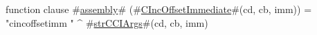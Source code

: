 function clause #\hyperref[sailMIPSzassembly]{assembly}# (#\hyperref[sailMIPSzCIncOffsetImmediate]{CIncOffsetImmediate}#(cd, cb, imm)) = "cincoffsetimm " ^ #\hyperref[sailMIPSzstrCCIArgs]{strCCIArgs}#(cd, cb, imm)
